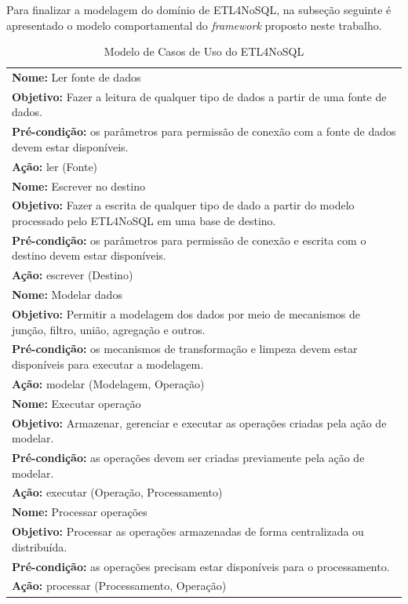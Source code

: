 Para finalizar a modelagem do domínio de ETL4NoSQL, na subseção seguinte é apresentado o modelo comportamental do \textit{framework} proposto neste trabalho.



\begin{table}[h!]
	\centering
	\caption{Modelo de Casos de Uso do ETL4NoSQL}
	\label{casosdeuso}
	\begin{tabular}{|p{14cm}|}
		\hline
			\textbf{Nome:} Ler fonte de dados\\ 
			\textbf{Objetivo:} Fazer a leitura de qualquer tipo de dados a partir de uma fonte de dados.\\ 
			\textbf{Pré-condição:} os parâmetros para permissão de conexão com a fonte de dados devem estar disponíveis.\\ 
			\textbf{Ação:} ler (Fonte)\\ 
		\hline
			\textbf{Nome:} Escrever no destino\\ 
			\textbf{Objetivo:} Fazer a escrita de qualquer tipo de dado a partir do modelo processado pelo ETL4NoSQL em uma base de destino.\\ 
			\textbf{Pré-condição:} os parâmetros para permissão de conexão e escrita com o destino devem estar disponíveis.\\ 
			\textbf{Ação:} escrever (Destino)  \\ 
	\hline
			\textbf{Nome:} Modelar dados\\ 
			\textbf{Objetivo:} Permitir a modelagem dos dados por meio de mecanismos de junção, filtro, união, agregação e outros. \\
			 \textbf{Pré-condição:} os mecanismos de transformação e limpeza devem estar disponíveis para executar a modelagem.\\ 
			 \textbf{Ação:} modelar (Modelagem, Operação)\\ 
	 \hline
	 		\textbf{Nome:} Executar operação\\ 
	 		\textbf{Objetivo:} Armazenar, gerenciar e executar as operações criadas pela ação de modelar.\\
	 		\textbf{Pré-condição:} as operações devem ser criadas previamente pela ação de modelar.\\ 
	 		\textbf{Ação:} executar (Operação, Processamento)\\ 
	 \hline
	 	\textbf{Nome:} Processar operações\\ 
	 	\textbf{Objetivo:} Processar as operações armazenadas de forma centralizada ou distribuída.\\
	 	\textbf{Pré-condição:} as operações precisam estar disponíveis para o processamento.\\ 
	 	\textbf{Ação:} processar (Processamento, Operação)\\ 
	 \hline
	 
	\end{tabular}
\end{table}

